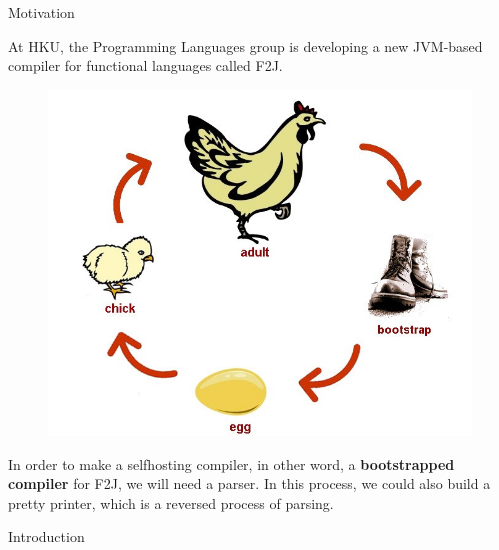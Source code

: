 \documentclass[final]{beamer}
\newlength{\onecolwid}
\begin{document}
\begin{frame}[t]
\begin{columns}[t]
\begin{column}{\onecolwid}
\begin{figure}
\end{figure}


\begin{block}{Motivation}

At HKU, the Programming Languages group is developing a new JVM-based compiler for functional languages called F2J.

\begin{figure}
\includegraphics[width=0.9\linewidth]{img/bootstrapping.jpg}

\end{figure}

In order to make a selfhosting compiler, in other word, a \textbf{bootstrapped compiler} for F2J, we will need a parser. In this process, we could also build a pretty printer, which is a reversed process of parsing.

\end{block}

\begin{block}{Introduction}



\end{block}
\end{column}
\end{columns}
\end{frame}
\end{document}
